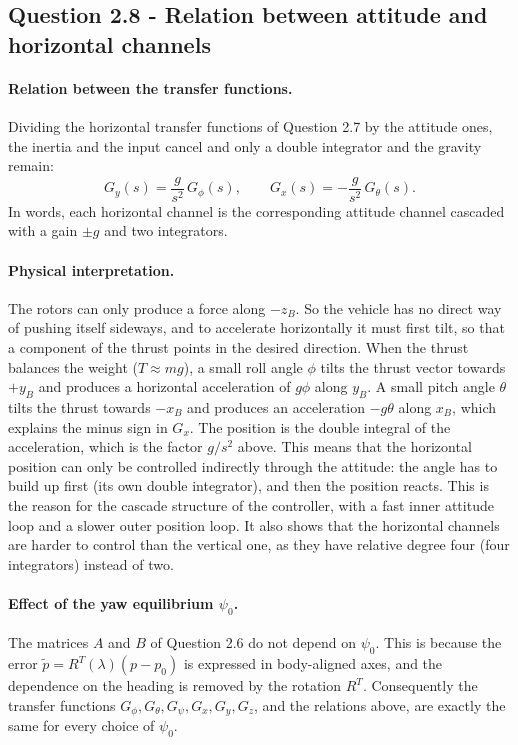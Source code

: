 \subsection*{Question 2.8 - Relation between attitude and horizontal channels}

\paragraph{Relation between the transfer functions.}
Dividing the horizontal transfer functions of Question 2.7 by the attitude ones, the inertia and the input cancel and only a double integrator and the gravity remain:
\begin{equation*}
G_y(s) = \frac{g}{s^2}\, G_\phi(s), \qquad
G_x(s) = -\frac{g}{s^2}\, G_\theta(s).
\end{equation*}
In words, each horizontal channel is the corresponding attitude channel cascaded with a gain $\pm g$ and two integrators.

\paragraph{Physical interpretation.}
The rotors can only produce a force along $-z_B$.
So the vehicle has no direct way of pushing itself sideways, and to accelerate horizontally it must first tilt, so that a component of the thrust points in the desired direction.
When the thrust balances the weight ($T \approx m g$), a small roll angle $\phi$ tilts the thrust vector towards $+y_B$ and produces a horizontal acceleration of $g\phi$ along $y_B$.
A small pitch angle $\theta$ tilts the thrust towards $-x_B$ and produces an acceleration $-g\theta$ along $x_B$, which explains the minus sign in $G_x$.
The position is the double integral of the acceleration, which is the factor $g/s^2$ above.
This means that the horizontal position can only be controlled indirectly through the attitude: the angle has to build up first (its own double integrator), and then the position reacts.
This is the reason for the cascade structure of the controller, with a fast inner attitude loop and a slower outer position loop.
It also shows that the horizontal channels are harder to control than the vertical one, as they have relative degree four (four integrators) instead of two.

\paragraph{Effect of the yaw equilibrium $\psi_0$.}
The matrices $A$ and $B$ of Question 2.6 do not depend on $\psi_0$.
This is because the error $\tilde p = R^T(\lambda)(p - p_0)$ is expressed in body-aligned axes, and the dependence on the heading is removed by the rotation $R^T$.
Consequently the transfer functions $G_\phi, G_\theta, G_\psi, G_x, G_y, G_z$, and the relations above, are exactly the same for every choice of $\psi_0$.

